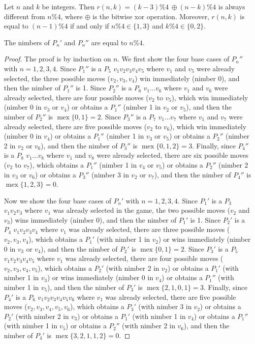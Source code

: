 \documentclass[10pt,a4paper]{amsart}
\DeclareMathOperator{\mex}{mex}
\newcommand{\xor}{\oplus}
\begin{document}
\begin{claim}\label{claim1}
Let $n$ and $k$ be integers. Then $r(n,k)=(k-3)\% 4\ \xor (n-k)\% 4$ is always different from $n\% 4$, where $\xor$ is the bitwise xor operation. Moreover, $r(n,k)$ is equal to $(n-1)\% 4$ if and only if $n\% 4\in\{1,3\}$ and $k\% 4\in\{0,2\}$.
\end{claim}

\begin{lemma}\label{lemma1}
The nimbers of $P_n'$ and $P_n''$ are equal to $n\% 4$.
\end{lemma}

\begin{proof}
The proof is by induction on $n$.
We first show the four base cases of $P_n''$ with $n=1,2,3,4$.
Since $P_1''$ is a $P_5$ $v_1v_2v_3v_4v_5$ where $v_1$ and $v_5$ were already selected, the three possible moves ($v_2,v_3,v_4$) win immediately (nimber $0$), and then the nimber of $P_1''$ is 1.
Since $P_2''$ is a $P_6$ $v_1\ldots v_6$ where $v_1$ and $v_6$ were already selected, there are four possible moves ($v_2$ to $v_5$), which win immediately (nimber $0$ in $v_3$ or $v_4$) or obtains a $P_1''$ (nimber 1 in $v_2$ or $v_5$), and then the nimber of $P_2''$ is $\mex\{0,1\}=2$.
Since $P_3''$ is a $P_7$ $v_1\ldots v_7$ where $v_1$ and $v_7$ were already selected, there are five possible moves ($v_2$ to $v_6$), which win immediately (nimber $0$ in $v_4$) or obtains a $P_1''$ (nimber 1 in $v_3$ or $v_5$) or obtains a $P_2''$ (nimber 2 in $v_2$ or $v_6$), and then the nimber of $P_3''$ is $\mex\{0,1,2\}=3$.
Finally, since $P_4''$ is a $P_8$ $v_1\ldots v_8$ where $v_1$ and $v_8$ were already selected, there are six possible moves ($v_2$ to $v_7$), which obtains a $P_1''$ (nimber 1 in $v_4$ or $v_5$) or obtains a $P_2''$ (nimber 2 in $v_3$ or $v_6$) or obtains a $P_3''$ (nimber 3 in $v_2$ or $v_7$), and then the nimber of $P_4''$ is $\mex\{1,2,3\}=0$.

Now we show the four base cases of $P_n'$ with $n=1,2,3,4$.
Since $P_1'$ is a $P_3$ $v_1v_2v_3$ where $v_1$ was already selected in the game, the two possible moves ($v_2$ and $v_3$) wins immediately (nimber $0$), and then the nimber of $P_1'$ is 1.
Since $P_2'$ is a $P_4$ $v_1v_2v_3v_4$ where $v_1$ was already selected, there are three possible moves ($v_2,v_3,v_4$), which obtains a $P_1'$ (with nimber 1 in $v_2$) or wins immediately (nimber $0$ in $v_3$ or $v_4$), and then the nimber of $P_2'$ is $\mex\{0,1\}=2$.
Since $P_3'$ is a $P_5$ $v_1v_2v_3v_4v_5$ where $v_1$ was already selected, there are four possible moves ($v_2,v_3,v_4,v_5$), which obtains a $P_2'$ (with nimber 2 in $v_2$) or obtains a $P_1'$ (with nimber 1 in $v_3$) or wins immediately (nimber $0$ in $v_4$) or obtains a $P_1''$ (with nimber 1 in $v_5$), and then the nimber of $P_3'$ is $\mex\{2,1,0,1\}=3$.
Finally, since $P_4'$ is a $P_6$ $v_1v_2v_3v_4v_5v_6$ where $v_1$ was already selected, there are five possible moves ($v_2,v_3,v_4,v_5,v_6$), which obtains a $P_3'$ (with nimber 3 in $v_2$) or obtains a $P_2'$ (with nimber 2 in $v_3$) or obtains a $P_1'$ (with nimber 1 in $v_4$) or obtains a $P_1''$ (with nimber 1 in $v_5$) or obtains a $P_2''$ (with nimber 2 in $v_6$), and then the nimber of $P_4'$ is $\mex\{3,2,1,1,2\}=0$.


\end{proof}
\end{document}
